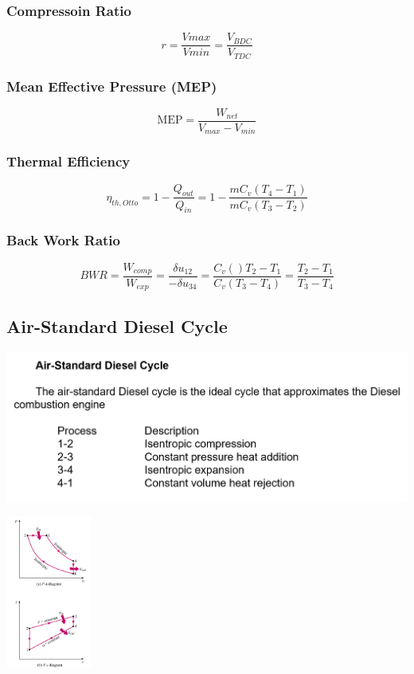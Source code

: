 \documentclass[10pt,landscape]{article}
\newenvironment{Figure}
     {\par\medskip\noindent\minipage{\linewidth}}
     {\endminipage\par\medskip}
\begin{document}
\begin{multicols}{3}
\subsubsection{Compressoin Ratio}
\begin{equation}
    r=\frac{Vmax}{Vmin}=\frac{V_{BDC}}{V_{TDC}}
\end{equation}
\subsubsection{Mean Effective Pressure (MEP)}
\begin{equation}
    \text{MEP}=\frac{W_{net}}{V_{max}-V_{min}}
\end{equation}
\subsubsection{Thermal Efficiency}
\begin{equation}
    \eta_{th,Otto}=1-\frac{Q_{out}}{Q_{in}}=1-\frac{mC_v(T_4-T_1)}{mC_v(T_3-T_2)}
\end{equation}
\subsubsection{Back Work Ratio}
\begin{equation}
    BWR=\frac{W_{comp}}{W_{exp}}=\frac{\delta u_{12}}{-\delta u_{34}}=\frac{C_v()T_2-T_1}{C_v(T_3-T_4)}=\frac{T_2-T_1}{T_3-T_4}
\end{equation}

\subsection{Air-Standard Diesel Cycle}
\begin{Figure}
    \centering
    \includegraphics[width=\linewidth, height=5cm]{Air-Standard_DieselCycle.png}
\end{Figure}
\begin{Figure}
    \centering
    \includegraphics[width=\linewidth, height=5cm]{Air-Standard_DieselCycle_PVTS.png}
\end{Figure}

\end{multicols}
\end{document}
